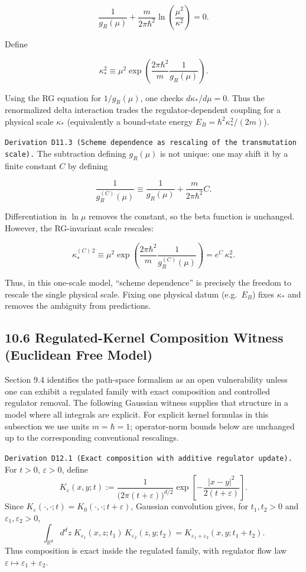 \documentclass[
]{article}
\begin{document}
\[
\frac{1}{g_R(\mu)}
+\frac{m}{2\pi\hbar^2}\ln\!\left(\frac{\mu^2}{\kappa^2}\right)
=0.
\]

Define

\[
\kappa_\ast^2
\equiv
\mu^2\exp\!\left(\frac{2\pi\hbar^2}{m}\frac{1}{g_R(\mu)}\right).
\]

Using the RG equation for \(1/g_R(\mu)\), one checks
\(d\kappa_\ast/d\mu=0\). Thus the renormalized delta interaction trades
the regulator-dependent coupling for a physical scale \(\kappa_\ast\)
(equivalently a bound-state energy \(E_B=\hbar^2\kappa_\ast^2/(2m)\)).

\texttt{Derivation\ D11.3\ (Scheme\ dependence\ as\ rescaling\ of\ the\ transmutation\ scale).}
The subtraction defining \(g_R(\mu)\) is not unique: one may shift it by
a finite constant \(C\) by defining

\[
\frac{1}{g_R^{(C)}(\mu)}
\equiv
\frac{1}{g_R(\mu)}+\frac{m}{2\pi\hbar^2}C.
\]

Differentiation in \(\ln\mu\) removes the constant, so the beta function
is unchanged. However, the RG-invariant scale rescales:

\[
\kappa_{\ast}^{(C)\,2}
\equiv
\mu^2\exp\!\left(\frac{2\pi\hbar^2}{m}\frac{1}{g_R^{(C)}(\mu)}\right)
=e^{C}\,\kappa_\ast^2.
\]

Thus, in this one-scale model, ``scheme dependence'' is precisely the
freedom to rescale the single physical scale. Fixing one physical datum
(e.g.~\(E_B\)) fixes \(\kappa_\ast\) and removes the ambiguity from
predictions.

\hypertarget{regulated-kernel-composition-witness-euclidean-free-model}{%
\subsection{10.6 Regulated-Kernel Composition Witness (Euclidean Free
Model)}\label{regulated-kernel-composition-witness-euclidean-free-model}}

Section 9.4 identifies the path-space formalism as an open vulnerability
unless one can exhibit a regulated family with exact composition and
controlled regulator removal. The following Gaussian witness supplies
that structure in a model where all integrals are explicit. For explicit
kernel formulas in this subsection we use units \(m=\hbar=1\);
operator-norm bounds below are unchanged up to the corresponding
conventional rescalings.

\texttt{Derivation\ D12.1\ (Exact\ composition\ with\ additive\ regulator\ update).}
For \(t>0\), \(\varepsilon>0\), define \[
K_\varepsilon(x,y;t)
:=
\frac{1}{\bigl(2\pi(t+\varepsilon)\bigr)^{d/2}}
\exp\!\left[-\frac{|x-y|^2}{2(t+\varepsilon)}\right].
\] Since
\(K_\varepsilon(\cdot,\cdot;t)=K_0(\cdot,\cdot;t+\varepsilon)\),
Gaussian convolution gives, for \(t_1,t_2>0\) and
\(\varepsilon_1,\varepsilon_2>0\), \[
\int_{\mathbb R^d} d^dz\;
K_{\varepsilon_1}(x,z;t_1)\,
K_{\varepsilon_2}(z,y;t_2)
=
K_{\varepsilon_1+\varepsilon_2}(x,y;t_1+t_2).
\] Thus composition is exact inside the regulated family, with regulator
flow law \(\varepsilon\mapsto\varepsilon_1+\varepsilon_2\).
\end{document}
